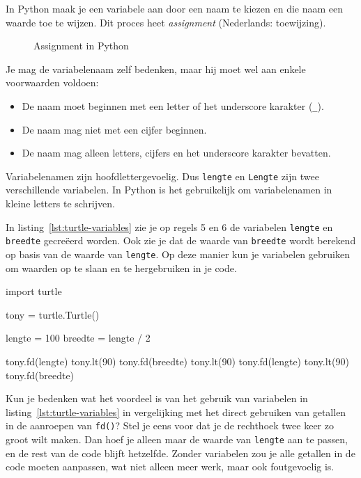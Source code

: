 \documentclass[../main]{subfiles}
\begin{document}
In Python maak je een variabele aan door een naam te kiezen en die naam een waarde toe te wijzen. Dit proces heet \emph{assignment} (Nederlands: toewijzing).

\begin{figure}[ht]
\centering
{}
\caption{Assignment in Python}
\label{fig:assignment}
\end{figure}

Je mag de variabelenaam zelf bedenken, maar hij moet wel aan enkele voorwaarden voldoen:
\begin{itemize}
\item De naam moet beginnen met een letter of het underscore karakter (\texttt{\_}).
\item De naam mag niet met een cijfer beginnen.
\item De naam mag alleen letters, cijfers en het underscore karakter bevatten.
\end{itemize}

Variabelenamen zijn hoofdlettergevoelig. Dus \texttt{lengte} en \texttt{Lengte} zijn twee verschillende variabelen. In Python is het gebruikelijk om variabelenamen in kleine letters te schrijven.

In listing~\ref{lst:turtle-variables} zie je op regels 5 en 6 de variabelen \texttt{lengte} en \texttt{breedte} gecreëerd worden. Ook zie je dat de waarde van \texttt{breedte} wordt berekend op basis van de waarde van \texttt{lengte}. Op deze manier kun je variabelen gebruiken om waarden op te slaan en te hergebruiken in je code.

\begin{python}[style=mu, caption={\file{turtle\_variables.py}}, label={lst:turtle-variables}]
import turtle

tony = turtle.Turtle()

lengte = 100
breedte = lengte / 2

tony.fd(lengte)
tony.lt(90)
tony.fd(breedte)
tony.lt(90)
tony.fd(lengte)
tony.lt(90)
tony.fd(breedte)
\end{python}

Kun je bedenken wat het voordeel is van het gebruik van variabelen in listing~\ref{lst:turtle-variables} in vergelijking met het direct gebruiken van getallen in de aanroepen van \texttt{fd()}? Stel je eens voor dat je de rechthoek twee keer zo groot wilt maken. Dan hoef je alleen maar de waarde van \texttt{lengte} aan te passen, en de rest van de code blijft hetzelfde. Zonder variabelen zou je alle getallen in de code moeten aanpassen, wat niet alleen meer werk, maar ook foutgevoelig is.
\end{document}
